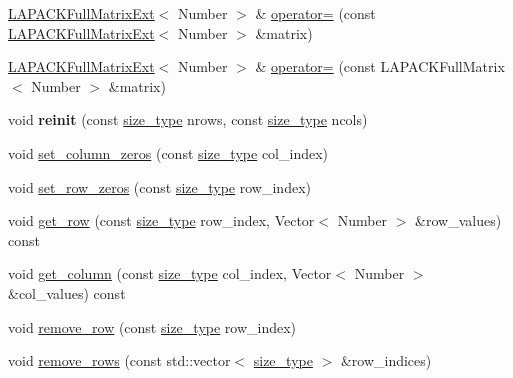 \begin{DoxyCompactItemize}
\item 
\hyperlink{classLAPACKFullMatrixExt}{L\+A\+P\+A\+C\+K\+Full\+Matrix\+Ext}$<$ Number $>$ \& \hyperlink{classLAPACKFullMatrixExt_a48a8520d322ba5be9f5bb38e67f9b01b}{operator=} (const \hyperlink{classLAPACKFullMatrixExt}{L\+A\+P\+A\+C\+K\+Full\+Matrix\+Ext}$<$ Number $>$ \&matrix)
\item 
\hyperlink{classLAPACKFullMatrixExt}{L\+A\+P\+A\+C\+K\+Full\+Matrix\+Ext}$<$ Number $>$ \& \hyperlink{classLAPACKFullMatrixExt_ae277e753101db17ebf5bbd43dd04ab27}{operator=} (const L\+A\+P\+A\+C\+K\+Full\+Matrix$<$ Number $>$ \&matrix)
\item 
\mbox{\label{classLAPACKFullMatrixExt_ae67c72d9ba641f02dc0e3b3486b95a10}} 
void {\bfseries reinit} (const \hyperlink{classLAPACKFullMatrixExt_a5cf5f4a6104dc17029210b5ca52bf574}{size\+\_\+type} nrows, const \hyperlink{classLAPACKFullMatrixExt_a5cf5f4a6104dc17029210b5ca52bf574}{size\+\_\+type} ncols)
\item 
void \hyperlink{classLAPACKFullMatrixExt_a0ee8a3f97dc3f391f9c963d6a275a25b}{set\+\_\+column\+\_\+zeros} (const \hyperlink{classLAPACKFullMatrixExt_a5cf5f4a6104dc17029210b5ca52bf574}{size\+\_\+type} col\+\_\+index)
\item 
void \hyperlink{classLAPACKFullMatrixExt_abf191c72c4a8813470f32c6107f2ffbc}{set\+\_\+row\+\_\+zeros} (const \hyperlink{classLAPACKFullMatrixExt_a5cf5f4a6104dc17029210b5ca52bf574}{size\+\_\+type} row\+\_\+index)
\item 
void \hyperlink{classLAPACKFullMatrixExt_abc010374ccacc6d1e482196af807d247}{get\+\_\+row} (const \hyperlink{classLAPACKFullMatrixExt_a5cf5f4a6104dc17029210b5ca52bf574}{size\+\_\+type} row\+\_\+index, Vector$<$ Number $>$ \&row\+\_\+values) const
\item 
void \hyperlink{classLAPACKFullMatrixExt_a1d1f6836c88ae08fa79bf6c63f7a3184}{get\+\_\+column} (const \hyperlink{classLAPACKFullMatrixExt_a5cf5f4a6104dc17029210b5ca52bf574}{size\+\_\+type} col\+\_\+index, Vector$<$ Number $>$ \&col\+\_\+values) const
\item 
void \hyperlink{classLAPACKFullMatrixExt_a28fcbdee16b201644ef5c1a7beccfeb6}{remove\+\_\+row} (const \hyperlink{classLAPACKFullMatrixExt_a5cf5f4a6104dc17029210b5ca52bf574}{size\+\_\+type} row\+\_\+index)
\item 
void \hyperlink{classLAPACKFullMatrixExt_a98d770a58dd87d57a3763f55e0b45502}{remove\+\_\+rows} (const std\+::vector$<$ \hyperlink{classLAPACKFullMatrixExt_a5cf5f4a6104dc17029210b5ca52bf574}{size\+\_\+type} $>$ \&row\+\_\+indices)

\end{DoxyCompactItemize}
